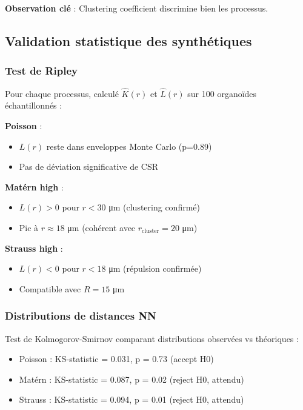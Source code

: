 \textbf{Observation clé} : Clustering coefficient discrimine bien les processus.

\subsection{Validation statistique des synthétiques}

\subsubsection{Test de Ripley}

Pour chaque processus, calculé $\hat{K}(r)$ et $\hat{L}(r)$ sur 100 organoïdes échantillonnés :

\textbf{Poisson} :
\begin{itemize}
    \item $L(r)$ reste dans enveloppes Monte Carlo (p=0.89)
    \item Pas de déviation significative de CSR
\end{itemize}

\textbf{Matérn high} :
\begin{itemize}
    \item $L(r) > 0$ pour $r < 30$ μm (clustering confirmé)
    \item Pic à $r \approx 18$ μm (cohérent avec $r_{\text{cluster}} = 20$ μm)
\end{itemize}

\textbf{Strauss high} :
\begin{itemize}
    \item $L(r) < 0$ pour $r < 18$ μm (répulsion confirmée)
    \item Compatible avec $R = 15$ μm
\end{itemize}

\subsubsection{Distributions de distances NN}

Test de Kolmogorov-Smirnov comparant distributions observées vs théoriques :
\begin{itemize}
    \item Poisson : KS-statistic = 0.031, p = 0.73 (accept H0)
    \item Matérn : KS-statistic = 0.087, p = 0.02 (reject H0, attendu)
    \item Strauss : KS-statistic = 0.094, p = 0.01 (reject H0, attendu)
\end{itemize}

